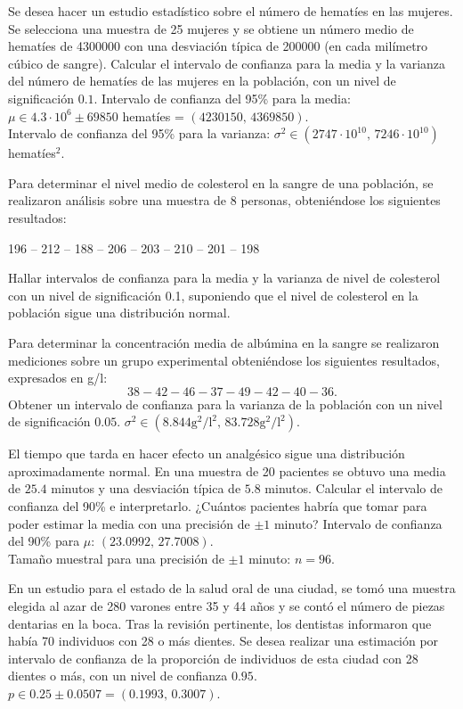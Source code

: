 {Se desea hacer un estudio estadístico sobre el número de hematíes en las mujeres.
Se selecciona una muestra de 25 mujeres y se obtiene un número medio de hematíes de 4300000 con una desviación típica
de 200000 (en cada milímetro cúbico de sangre).
Calcular el intervalo de confianza para la media y la varianza del número de hematíes de las mujeres en la población,
con un nivel de significación $0.1$.
}
{
Intervalo de confianza del 95\% para la media: $\mu \in 4.3\cdot 10^6\pm 69850$ hematíes = $(4230150,\,4369850)$.\\
Intervalo de confianza del 95\% para la varianza: $\sigma^2\in (2747\cdot 10^10,\,7246\cdot 10^10)$ hematíes$^2$. 
}
{}


{Para determinar el nivel medio de colesterol en la sangre de una población, se realizaron análisis sobre una muestra
de 8 personas, obteniéndose los siguientes resultados:
\begin{center}
196 -- 212 -- 188 -- 206 -- 203 -- 210 -- 201 -- 198
\end{center}
Hallar intervalos de confianza para la media y la varianza de nivel de colesterol con un nivel de significación 0.1, suponiendo que el nivel de colesterol en la población sigue una distribución normal.
}
{}
{}


{Para determinar la concentración media de albúmina en la sangre se realizaron mediciones sobre un grupo experimental
obteniéndose los siguientes resultados, expresados en g/l: 
\[38-42-46-37-49-42-40-36.\]
Obtener un intervalo de confianza para la varianza de la población con un nivel de significación $0.05$.
}
{
$\sigma^2\in (8.844\text{g}^2/\text{l}^2,\,83.728\text{g}^2/\text{l}^2)$.
}
{}


{El tiempo que tarda en hacer efecto un analgésico sigue una distribución aproximadamente normal.
En una muestra de 20 pacientes se obtuvo una media de $25.4$ minutos y una desviación típica de $5.8$ minutos.
Calcular el intervalo de confianza del 90\% e interpretarlo.
¿Cuántos pacientes habría que tomar para poder estimar la media con una precisión de $\pm 1$ minuto? }
{Intervalo de confianza del 90\% para $\mu$: $(23.0992,\,27.7008)$.\\
Tamaño muestral para una precisión de $\pm 1$ minuto: $n=96$.}
{}


{En un estudio para el estado de la salud oral de una ciudad, se tomó una muestra elegida al azar de 280 varones entre
35 y 44 años y se contó el número de piezas dentarias en la boca.
Tras la revisión pertinente, los dentistas informaron que había 70 individuos con 28 o más dientes.
Se desea realizar una estimación por intervalo de confianza de la proporción de individuos de esta ciudad con 28
dientes o más, con un nivel de confianza $0.95$.
}
{
$p\in 0.25\pm 0.0507 = (0.1993,\,0.3007)$.
}
{}


